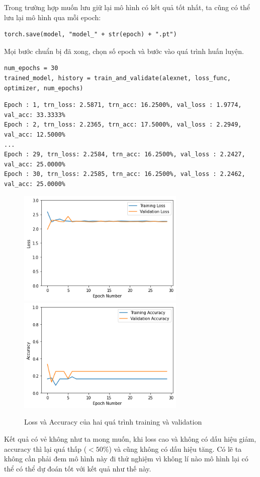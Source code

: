 \documentclass[a4paper]{article}
\begin{document}
Trong trường hợp muốn lưu giữ lại mô hình có kết quả tốt nhất, ta cũng có thể lưu lại mô hình qua mỗi epoch:
\begin{lstlisting}
torch.save(model, "model_" + str(epoch) + ".pt")
\end{lstlisting}
Mọi bước chuẩn bị đã xong, chọn số epoch và bước vào quá trình huấn luyện.
\begin{lstlisting}
num_epochs = 30
trained_model, history = train_and_validate(alexnet, loss_func, optimizer, num_epochs)
\end{lstlisting}
\begin{verbatim}
Epoch : 1, trn_loss: 2.5871, trn_acc: 16.2500%, val_loss : 1.9774, val_acc: 33.3333%
Epoch : 2, trn_loss: 2.2365, trn_acc: 17.5000%, val_loss : 2.2949, val_acc: 12.5000%
...
Epoch : 29, trn_loss: 2.2584, trn_acc: 16.2500%, val_loss : 2.2427, val_acc: 25.0000%
Epoch : 30, trn_loss: 2.2585, trn_acc: 16.2500%, val_loss : 2.2462, val_acc: 25.0000%
\end{verbatim}
\begin{figure}[h!]
\centering
{{\includegraphics[width=8cm]{images/loss.png} }}
\qquad
{{\includegraphics[width=8cm]{images/acc.png} }}
\caption{Loss và Accuracy của hai quá trình training và validation}
\end{figure}
Kết quả có vẻ không như ta mong muốn, khi loss cao và không có dấu hiệu giảm, accuracy thì lại quá thấp ($< 50\%$) và cũng không có dấu hiệu tăng. Có lẽ ta không cần phải đem mô hình này đi thử nghiệm vì không lí nào mô hình lại có thể có thể dự đoán tốt với kết quả như thế này.\\
\end{document}
